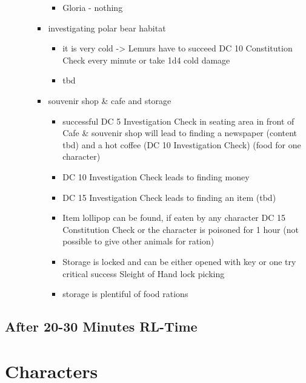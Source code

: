 \begin{itemize}
\begin{itemize}
\begin{itemize}
\begin{itemize}
				\item Gloria - nothing
			\end{itemize}
			\item investigating polar bear habitat
			\begin{itemize}
				\item it is very cold -> Lemurs have to succeed DC 10 Constitution Check every minute or take 1d4 cold damage
				\item tbd
			\end{itemize}
			\item souvenir shop \& cafe and storage
			\begin{itemize}
				\item successful DC 5 Investigation Check in seating area in front of Cafe \& souvenir shop will lead to finding a newspaper (content tbd) and a hot coffee (DC 10 Investigation Check) (food for one character)
				\item DC 10 Investigation Check leads to finding money
				\item DC 15 Investigation Check leads to finding an item (tbd)
				\item Item lollipop can be found, if eaten by any character DC 15 Constitution Check or the character is poisoned for 1 hour (not possible to give other animals for ration)
				\item Storage is locked and can be either opened with key or one try critical success Sleight of Hand lock picking
				\item storage is plentiful of food rations
			\end{itemize}
		\end{itemize}
	\end{itemize}
\end{itemize}
\subsection*{After 20-30 Minutes RL-Time}

\clearpage
\section*{Characters}
